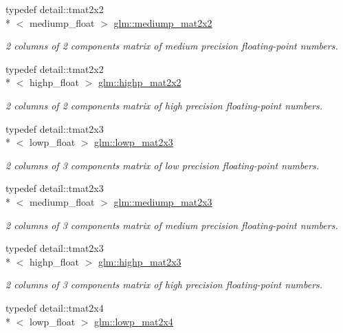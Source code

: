 \begin{DoxyCompactItemize}
typedef detail\-::tmat2x2\\*
$<$ mediump\-\_\-float $>$ \hyperlink{group__core__precision_gaa78fd2384931c244700851141b8a47eb}{glm\-::mediump\-\_\-mat2x2}
\begin{DoxyCompactList}\small\item\em 2 columns of 2 components matrix of medium precision floating-\/point numbers. \end{DoxyCompactList}\item 
typedef detail\-::tmat2x2\\*
$<$ highp\-\_\-float $>$ \hyperlink{group__core__precision_gadc6208de252d8c5d4afd1a3518370db3}{glm\-::highp\-\_\-mat2x2}
\begin{DoxyCompactList}\small\item\em 2 columns of 2 components matrix of high precision floating-\/point numbers. \end{DoxyCompactList}\item 
typedef detail\-::tmat2x3\\*
$<$ lowp\-\_\-float $>$ \hyperlink{group__core__precision_ga094f5266f214da7ef32e49df6432f4fa}{glm\-::lowp\-\_\-mat2x3}
\begin{DoxyCompactList}\small\item\em 2 columns of 3 components matrix of low precision floating-\/point numbers. \end{DoxyCompactList}\item 
typedef detail\-::tmat2x3\\*
$<$ mediump\-\_\-float $>$ \hyperlink{group__core__precision_gac44c7deb23abed76330948e10d919bcc}{glm\-::mediump\-\_\-mat2x3}
\begin{DoxyCompactList}\small\item\em 2 columns of 3 components matrix of medium precision floating-\/point numbers. \end{DoxyCompactList}\item 
typedef detail\-::tmat2x3\\*
$<$ highp\-\_\-float $>$ \hyperlink{group__core__precision_ga89136b699656886b0941c95cf2778da3}{glm\-::highp\-\_\-mat2x3}
\begin{DoxyCompactList}\small\item\em 2 columns of 3 components matrix of high precision floating-\/point numbers. \end{DoxyCompactList}\item 
typedef detail\-::tmat2x4\\*
$<$ lowp\-\_\-float $>$ \hyperlink{group__core__precision_ga800238e68eee3279c7a38d4f3cd005e8}{glm\-::lowp\-\_\-mat2x4}

\end{DoxyCompactItemize}
